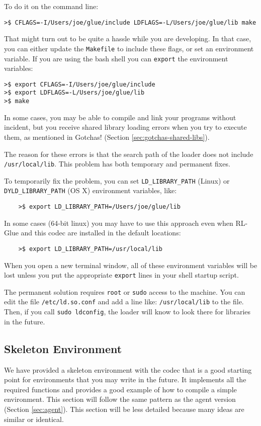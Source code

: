 \documentclass[11pt]{article}
\begin{document}
To do it on the command line:
\begin{verbatim}
>$ CFLAGS=-I/Users/joe/glue/include LDFLAGS=-L/Users/joe/glue/lib make
\end{verbatim}

That might turn out to be quite a hassle while you are developing.  In that case, you can either update the \texttt{Makefile} to include these flags, 
or set an environment variable.  If you are using the bash shell you can \texttt{export} the environment variables:
\begin{verbatim}
>$ export CFLAGS=-I/Users/joe/glue/include
>$ export LDFLAGS=-L/Users/joe/glue/lib
>$ make
\end{verbatim}

In some cases, you may be able to compile and link your programs without incident, but you receive shared library loading errors when you try to execute them, as mentioned in Gotchas! (Section \ref{sec:gotchas-shared-libs}).

The reason for these errors is that the search path of the loader does not include \texttt{/usr/local/lib}.  This problem has both temporary and permanent fixes.

To temporarily fix the problem, you can set \texttt{LD\_LIBRARY\_PATH} (Linux) or \texttt{DYLD\_LIBRARY\_PATH} (OS X) environment variables, like:
\begin{verbatim}
	>$ export LD_LIBRARY_PATH=/Users/joe/glue/lib
\end{verbatim}

In some cases (64-bit linux) you may have to use this approach even when RL-Glue and this codec are installed in the default locations:
\begin{verbatim}
	>$ export LD_LIBRARY_PATH=/usr/local/lib
\end{verbatim}

When you open a new terminal window, all of these environment variables will be lost unless you put the appropriate \texttt{export} lines in your shell startup script.

The permanent solution requires \texttt{root} or \texttt{sudo} access to the machine.  You can  edit the file \texttt{/etc/ld.so.conf} and add a line like: \texttt{/usr/local/lib} to the file.  Then, if you call \texttt{sudo ldconfig}, the loader will know to look there for libraries in the future.




\subsection{Skeleton Environment}
\label{sec:env}
We have provided a skeleton environment with the codec that is a good starting point for environments that you may write in the future.
It implements all the required functions and provides a good example of how to compile a simple environment.  This section will follow the same 
pattern as the agent version (Section \ref{sec:agent}).  This section will be less detailed because many ideas are similar or identical.
\end{document}
